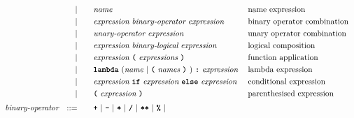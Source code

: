 \begin{alignat*}{9}
&&                       && |   &\quad &&  \textit{name}   && \textrm{name expression}\\
&&                       && |   &\quad &&  \textit{expression} \  \textit{binary-operator} \ 
                                            \textit{expression} \qquad
                                                           && \textrm{binary operator combination}\\
&&                       && |   &\quad &&   \textit{unary-operator} \ 
                                            \textit{expression}
                                                           && \textrm{unary operator combination}\\
&&                       && |   &\quad &&  \textit{expression} \  \textit{binary-logical} \ 
                                            \textit{expression} \qquad
                                                           && \textrm{logical composition}\\
&&                       && |   &\quad &&   \textit{expression}\ \textbf{\texttt{(}}\ \textit{expressions}\ \textbf{\texttt{)}}
                                                           && \textrm{function application}\\
&&                       && |   &\quad &&   \textbf{\texttt{lambda}}\ ( \textit{name}\ | \
                                               \textbf{\texttt{(}}\ \textit{names}\ \textbf{\texttt{)}}\
                                            )\    
                                            \texttt{\textbf{:}}\ \textit{expression}
                                                           && \textrm{lambda expression}\\
&&                       && |   &\quad &&   \textit{expression} \ \textbf{\texttt{if}}\ 
                                            \textit{expression}
                                            \ \textbf{\texttt{else}}\
                                            \textit{expression}\
                                                           && \textrm{conditional expression}\\
&&                       && |   &\quad &&  \textbf{\texttt{(}}\  \textit{expression} \ 
                                            \textbf{\texttt{)}} && \textrm{parenthesised expression}\\[1mm]
&& \textit{binary-operator}   
                        && ::= &\quad && \textbf{\texttt{+}}\ |\ \textbf{\texttt{-}}\ |\ \textbf{\texttt{*}}\ |\ \textbf{\texttt{/}}\ |\ \textbf{\texttt{**}}\ |\ \textbf{\texttt{\%}}\ | \\ 

\end{alignat*}
